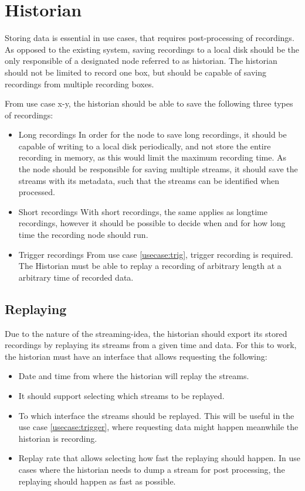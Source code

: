 \section{Historian}
Storing data is essential in use cases, that requires post-processing of recordings. As opposed to the existing system, saving recordings to a local disk should be the only responsible of a designated node referred to as historian.
The historian should not be limited to record one box, but should be capable of saving recordings from multiple recording boxes.

From use case x-y, the historian should be able to save the following three types of recordings:
\begin{itemize}
	\item Long recordings
		In order for the node to save long recordings, it should be capable of writing 			to a local disk periodically, and not store the entire recording in memory, 			as this would limit the maximum recording time. As the node should be responsible for 				saving multiple streams, it should save the streams with its metadata, such that the streams can be identified when processed.
	\item Short recordings
		With short recordings, the same applies as longtime recordings, however it 				should be possible to decide when and for how long time the recording node should 			run.
	\item Trigger recordings
		From use case \ref{usecase:trig}, trigger recording is required. The Historian must be able to replay a recording of arbitrary length at a arbitrary time of recorded data.
\end{itemize}


\subsection{Replaying}
Due to the nature of the streaming-idea, the historian should export its stored recordings by replaying its streams from a given time and data. For this to work, the historian must have an interface that allows requesting the following:

\begin{itemize}
	\item Date and time from where the historian will replay the streams.
	\item It should support selecting which streams to be replayed.
	\item To which interface the streams should be replayed. This will be useful in the use case \ref{usecase:trigger}, where requesting data might happen meanwhile the historian is recording.
	\item Replay rate that allows selecting how fast the replaying should happen. In use cases where the historian needs to dump a stream for post processing, the replaying should happen as fast as possible.
\end{itemize}

